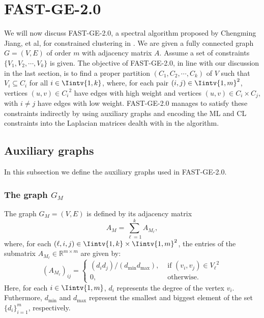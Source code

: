 \section{FAST-GE-2.0}
We will now discuss FAST-GE-2.0, a spectral algorithm proposed by Chengming Jiang, et al, for constrained clustering in \cite{fastge2}.
We are given a fully connected graph $G = (V,E)$ of order $m$ with adjacency matrix $A$.
Assume a set of constraints $\{V_1, V_2, \cdots, V_k \}$ is given.
The objective of FAST-GE-2.0, in line with our discussion in the last section, is to find a proper partition $(C_1, C_2, \cdots, C_k)$ of $V$ such that $V_i \subseteq C_i$ for all $i \in \Iintv{1,k}$, where, for each pair $(i,j) \in \Iintv{1,m}^2$, vertices $(u,v) \in {C_i}^2$ have edges with high weight and vertices $(u,v) \in {C_i} \times {C_j}$, with $i \ne j$ have edges with low weight.
FAST-GE-2.0 manages to satisfy these constraints indirectly by using auxiliary graphs and encoding the ML and CL constraints into the Laplacian matrices dealth with in the algorithm.

\subsection{Auxiliary graphs}
In this subsection we define the auxiliary graphs used in FAST-GE-2.0.

\subsubsection*{The graph $G_M$}

\begin{definition}
   The graph $G_M = (V,E)$ is defined by its adjacency matrix 
   \begin{equation}\label{am}
   A_M = \sum_{\ell = 1}^k A_{M_{\ell}},
\end{equation}
   where, for each $(\ell, i, j) \in \Iintv{1,k} \times \Iintv{1, m}^2$, the entries of the submatrix $A_{M_{\ell}} \in \mathbb R^{m \times m}$ are given by:
   \begin{equation}
      (A_{M_{\ell}})_{ij} =
      \begin{cases}
         (d_i d_j) / (d_{\min} d_{\max}), & \text{ if $(v_i, v_j) \in {V_{\ell}}^2$} \\
         0, & \text{ otherwise.}
      \end{cases}
\end{equation}
Here, for each $i \in \Iintv{1,m}$, $d_i$ represents the degree of the vertex $v_i$. 
Futhermore, $d_{\min}$ and $d_{\max}$ represent the smallest and biggest element of the set $\{ d_i \}_{i=1}^m$, respectively.
\end{definition}

